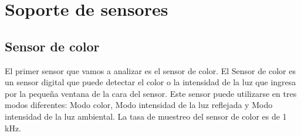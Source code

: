 \section{Soporte de sensores}
\label{sec:sensores}

\subsection{Sensor de color}

El primer sensor que vamos a analizar es el sensor de color. El Sensor de color es un sensor digital que puede detectar el color o la intensidad de la luz que ingresa por la pequeña ventana de la cara del sensor. Este sensor puede utilizarse en tres modos diferentes: Modo color, Modo intensidad de la luz reflejada y Modo intensidad de la luz ambiental.\newline
La tasa de muestreo del sensor de color es de 1 kHz.

